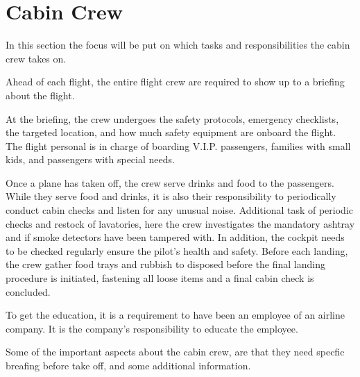 \section{Cabin Crew}
In this section the focus will be put on which tasks and responsibilities the cabin crew takes on. 

Ahead of each flight, the entire flight crew are required to show up to a briefing about the flight.

At the briefing, the crew undergoes the safety protocols, emergency checklists, the targeted location, and how much safety equipment are onboard the flight. The flight personal is in charge of boarding V.I.P. passengers, families with small kids, and passengers with special needs.

Once a plane has taken off, the crew serve drinks and food to the passengers. While they serve food and drinks, it is also their responsibility to periodically conduct cabin checks and listen for any unusual noise. Additional task of periodic checks and restock of lavatories, here the crew investigates the mandatory ashtray and if smoke detectors have been tampered with. In addition, the cockpit needs to be checked regularly ensure the pilot's health and safety. Before each landing, the crew gather food trays and rubbish to disposed before the final landing procedure is initiated, fastening all loose items and a final cabin check is concluded.

To get the education, it is a requirement to have been an employee of an airline company. It is the company’s responsibility to educate the employee. 

Some of the important aspects about the cabin crew, are that they need specfic breafing before take off, and some additional information.
